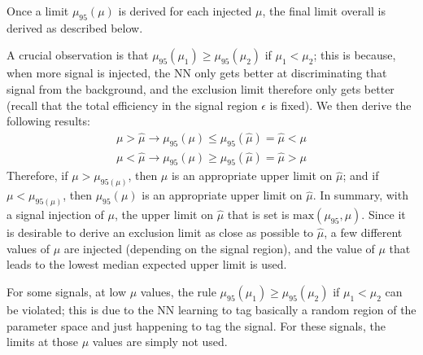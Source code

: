Once a limit $\mu_{95}(\mu)$ is derived for each injected $\mu$, the final limit overall is derived as described below.

A crucial observation is that $\mu_{95}(\mu_1) \ge \mu_{95}(\mu_2)$ if $\mu_1<\mu_2$; this is because, when more signal is injected, the NN only gets better at discriminating that signal from the background, and the exclusion limit therefore only gets better (recall that the total efficiency in the signal region $\epsilon$ is fixed).
We then derive the following results:
\begin{align}
  \mu > \hat{\mu} \rightarrow \mu_{95}(\mu) \le \mu_{95}(\hat{\mu}) = \hat{\mu} < \mu \\
  \mu < \hat{\mu} \rightarrow \mu_{95}(\mu) \ge \mu_{95}(\hat{\mu}) = \hat{\mu} > \mu
\end{align}
Therefore, if $\mu>\mu_{95(\mu)}$, then $\mu$ is an appropriate upper limit on $\hat{\mu}$; and if $\mu<\mu_{95(\mu)}$, then $\mu_{95}(\mu)$ is an appropriate upper limit on $\hat{\mu}$.
In summary, with a signal injection of $\mu$, the upper limit on $\hat{\mu}$ that is set is $\text{max}\left(\mu_{95},\mu\right)$.
Since it is desirable to derive an exclusion limit as close as possible to $\hat{\mu}$, a few different values of $\mu$ are injected (depending on the signal region), and the value of $\mu$ that leads to the lowest median expected upper limit is used.

For some signals, at low $\mu$ values, the rule $\mu_{95}(\mu_1) \ge \mu_{95}(\mu_2)$ if $\mu_1<\mu_2$ can be violated; this is due to the NN learning to tag basically a random region of the parameter space and just happening to tag the signal.
For these signals, the limits at those $\mu$ values are simply not used.



